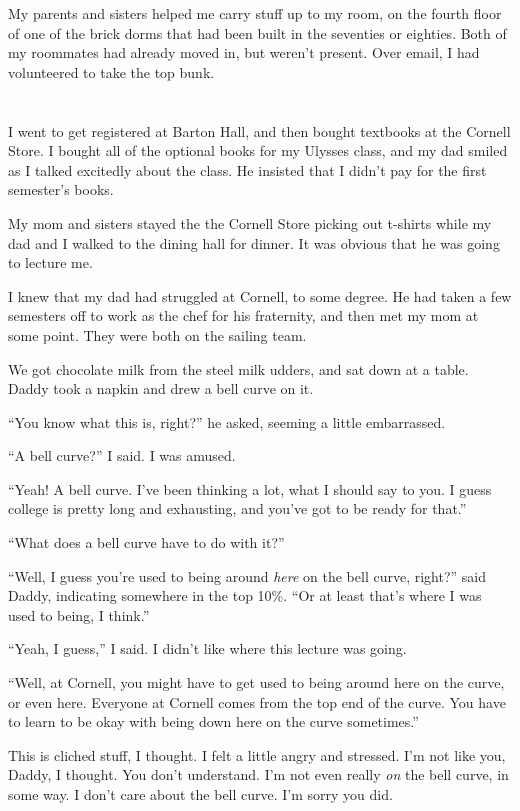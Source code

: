 My parents and sisters helped me carry stuff up to my room, on the fourth floor
of one of the brick dorms that had been built in the seventies or eighties.
Both of my roommates had already moved in, but weren't present.  Over email, I
had volunteered to take the top bunk.

\section{}

I went to get registered at Barton Hall, and then bought textbooks at the
Cornell Store.  I bought all of the optional books for my Ulysses class, and my
dad smiled as I talked excitedly about the class.  He insisted that I didn't pay
for the first semester's books.

My mom and sisters stayed the the Cornell Store picking out t-shirts while my
dad and I walked to the dining hall for dinner.  It was obvious that he was
going to lecture me.  

I knew that my dad had struggled at Cornell, to some degree.  He had taken a few
semesters off to work as the chef for his fraternity, and then met my mom at
some point.  They were both on the sailing team.

We got chocolate milk from the steel milk udders, and sat down at a table.
Daddy took a napkin and drew a bell curve on it.

``You know what this is, right?'' he asked, seeming a little embarrassed.

``A bell curve?'' I said.  I was amused.

``Yeah!  A bell curve.  I've been thinking a lot, what I should say to you.  I
guess college is pretty long and exhausting, and you've got to be ready for that.''  

``What does a bell curve have to do with it?''

``Well, I guess you're used to being around \textit{here} on the bell curve,
right?'' said Daddy, indicating somewhere in the top 10\%.  ``Or at least that's
where I was used to being, I think.''  

``Yeah, I guess,'' I said.  I didn't like where this lecture was going.

``Well, at Cornell, you might have to get used to being around here on the
curve, or even here.  Everyone at Cornell comes from the top end of the curve.
You have to learn to be okay with being down here on the curve sometimes.''

This is cliched stuff, I thought.  I felt a little angry and stressed.  I'm not
like you, Daddy, I thought.  You don't understand.  I'm not even really
\textit{on} the bell curve, in some way.  I don't care about the bell curve.
I'm sorry you did.

